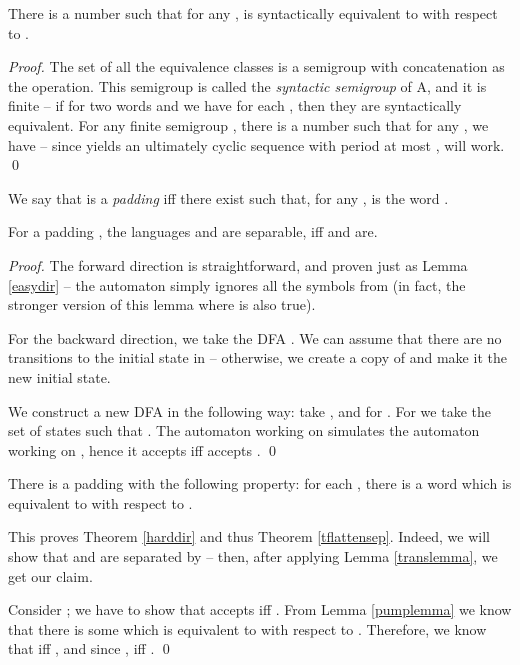\documentclass{article}
\begin{document}
\begin{lemma}\label{semigroup}
There is a number  such that for any ,
 is syntactically equivalent to  with respect to .
\end{lemma}

\begin{proof}
The set  of all the equivalence classes
is a semigroup with concatenation as the operation. This semigroup is called the
\emph{syntactic semigroup} of A, and it is finite -- if for 
two words  and  we have  for each ,
then they are syntactically equivalent.
For any finite semigroup , there is a number  such that 
for any , we have  -- since 
yields an ultimately cyclic sequence with period at most , 
 will work. \qed
\end{proof}


We say that  is a \emph{padding} iff
there exist  such that,
for any ,
 is the word .

\begin{lemma}\label{translemma}
For a padding , 
the languages  and  are separable, iff  and  are.
\end{lemma}

\begin{proof}
The forward direction is straightforward, and proven just as Lemma \ref{easydir}
-- the automaton simply ignores all the symbols from  (in fact,
the stronger version of this lemma where  is also true).

For the backward direction, we take the DFA .
We can assume that there are no transitions to the initial state  in  --
otherwise, we create a copy of  and make it the new initial state.

We construct a new DFA  in the following way: take
, and  for .
For  we take the set of states  such that . 
The
automaton  working on  simulates the automaton  working
on , hence it accepts  iff  accepts . \qed
\end{proof}

\begin{lemma}\label{pumplemma}
There is a padding  with the following property:
for each , there is a word 
which is equivalent to  with respect to .
\end{lemma}

This proves Theorem \ref{harddir} and thus Theorem \ref{tflattensep}. Indeed,
we will show that  and  are separated by  -- then, after
applying Lemma \ref{translemma}, we get our claim.

Consider ; we have to show that  accepts  iff .
From Lemma \ref{pumplemma} we know that there is some  which
is equivalent to  with respect to . Therefore, 
we know that  iff
, and since ,  iff . \qed
\end{document}
